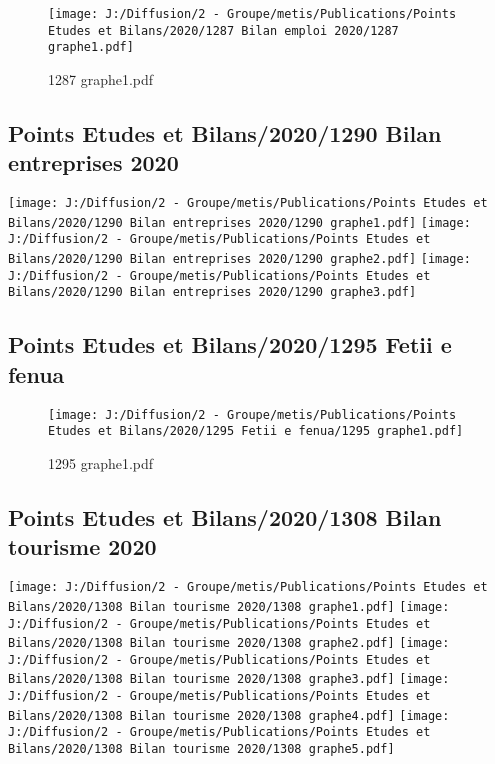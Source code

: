 \documentclass[
]{article}
\begin{document}
\begin{figure}
\centering
\texttt{[image: J:/Diffusion/2 - Groupe/metis/Publications/Points Etudes et Bilans/2020/1287 Bilan emploi 2020/1287 graphe1.pdf]}
\caption{1287 graphe1.pdf}
\end{figure}

\hypertarget{points-etudes-et-bilans20201290-bilan-entreprises-2020}{%
\subsection{Points Etudes et Bilans/2020/1290 Bilan entreprises
2020}\label{points-etudes-et-bilans20201290-bilan-entreprises-2020}}

\texttt{[image: J:/Diffusion/2 - Groupe/metis/Publications/Points Etudes et Bilans/2020/1290 Bilan entreprises 2020/1290 graphe1.pdf]}
\texttt{[image: J:/Diffusion/2 - Groupe/metis/Publications/Points Etudes et Bilans/2020/1290 Bilan entreprises 2020/1290 graphe2.pdf]}
\texttt{[image: J:/Diffusion/2 - Groupe/metis/Publications/Points Etudes et Bilans/2020/1290 Bilan entreprises 2020/1290 graphe3.pdf]}

\hypertarget{points-etudes-et-bilans20201295-fetii-e-fenua}{%
\subsection{Points Etudes et Bilans/2020/1295 Fetii e
fenua}\label{points-etudes-et-bilans20201295-fetii-e-fenua}}

\begin{figure}
\centering
\texttt{[image: J:/Diffusion/2 - Groupe/metis/Publications/Points Etudes et Bilans/2020/1295 Fetii e fenua/1295 graphe1.pdf]}
\caption{1295 graphe1.pdf}
\end{figure}

\hypertarget{points-etudes-et-bilans20201308-bilan-tourisme-2020}{%
\subsection{Points Etudes et Bilans/2020/1308 Bilan tourisme
2020}\label{points-etudes-et-bilans20201308-bilan-tourisme-2020}}

\texttt{[image: J:/Diffusion/2 - Groupe/metis/Publications/Points Etudes et Bilans/2020/1308 Bilan tourisme 2020/1308 graphe1.pdf]}
\texttt{[image: J:/Diffusion/2 - Groupe/metis/Publications/Points Etudes et Bilans/2020/1308 Bilan tourisme 2020/1308 graphe2.pdf]}
\texttt{[image: J:/Diffusion/2 - Groupe/metis/Publications/Points Etudes et Bilans/2020/1308 Bilan tourisme 2020/1308 graphe3.pdf]}
\texttt{[image: J:/Diffusion/2 - Groupe/metis/Publications/Points Etudes et Bilans/2020/1308 Bilan tourisme 2020/1308 graphe4.pdf]}
\texttt{[image: J:/Diffusion/2 - Groupe/metis/Publications/Points Etudes et Bilans/2020/1308 Bilan tourisme 2020/1308 graphe5.pdf]}
\end{document}
